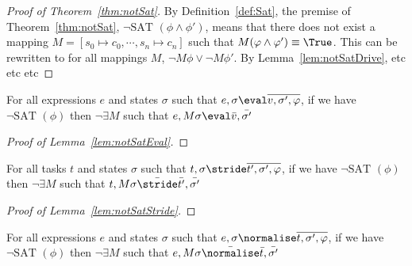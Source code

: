 
\onecolumn



\begin{proof}[Proof of Theorem~\ref{thm:notSat}]
  By Definition~\ref{def:Sat}, the premise of Theorem~\ref{thm:notSat}, $\neg\text{SAT }(\phi\land\phi')$,
  means that there does not exist a mapping $M=[s_0\mapsto c_0,\cdots,s_n\mapsto c_n]$ such that $M(\phi\land\phi')\equiv\True$.
  This can be rewritten to for all mappings $M$, $\neg M\phi \lor \neg M\phi'$.
  By Lemma~\ref{lem:notSatDrive}, etc etc etc 
\end{proof}

\begin{lemma}
  \label{lem:notSatEval}
  For all expressions $e$ and states $\sigma$ such that $e,\sigma\eval\overline{v,\sigma',\phi}$, if we have $\neg\text{SAT }(\phi)$ then $\neg\exists M$ such that $e,M\sigma\eval\bar{v},\bar{\sigma'}$

\end{lemma}

\begin{proof}[Proof of Lemma~\ref{lem:notSatEval}]

\end{proof}

\begin{lemma}
  \label{lem:notSatStride}
  For all tasks $t$ and states $\sigma$ such that $t,\sigma\stride\overline{t',\sigma',\phi}$, if we have $\neg\text{SAT }(\phi)$ then $\neg\exists M$ such that $t,M\sigma\bar{\stride}\bar{t'},\bar{\sigma'}$

\end{lemma}



\begin{proof}[Proof of Lemma~\ref{lem:notSatStride}]

\end{proof}

\begin{lemma}
  \label{lem:notSatNorm}
  For all expressions $e$ and states $\sigma$ such that $e,\sigma\normalise\overline{t,\sigma',\phi}$, if we have $\neg\text{SAT }(\phi)$ then $\neg\exists M$ such that $e,M\sigma\bar{\normalise}\bar{t},\bar{\sigma'}$

\end{lemma}



